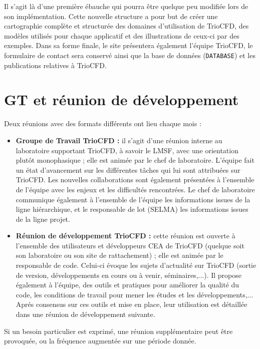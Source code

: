 Il s'agit l\`a d'une premi\`ere \'ebauche qui pourra \^etre quelque peu modifi\'ee lors de son impl\'ementation. Cette nouvelle structure a pour but de cr\'eer une cartographie compl\`ete et structur\'ee des domaines d'utilisation de TrioCFD, des mod\`eles utilis\'es pour chaque applicatif et des illustrations de ceux-ci par des exemples. Dans sa forme finale, le site pr\'esentera \'egalement l'\'equipe TrioCFD, le formulaire de contact sera conserv\'e ainsi que la base de donn\'ees (\texttt{DATABASE}) et les publications relatives \`a TrioCFD.

\chapter{GT et r\'eunion de d\'eveloppement}
Deux r\'eunions avec des formats diff\'erents ont lieu chaque mois :
\begin{itemize}[label=$\Rightarrow$, font=\LARGE]
\item \textbf{Groupe de Travail TrioCFD :} il s'agit d'une r\'eunion interne au laboratoire supportant TrioCFD, \`a savoir le LMSF, avec une orientation plut\^ot monophasique ; elle est anim\'ee par le chef de laboratoire. L'\'equipe fait un \'etat d'avancement sur les diff\'erentes t\^aches qui lui sont attribu\'ees sur TrioCFD. Les nouvelles collaborations sont \'egalement pr\'esent\'ees \`a l'ensemble de l'\'equipe avec les enjeux et les difficult\'es rencontr\'ees. Le chef de laboratoire communique \'egalement \`a l'ensemble de l'\'equipe les informations issues de la ligne hiérarchique, et le responsable de lot (SELMA) les informations issues de la ligne projet.
\item \textbf{R\'eunion de d\'eveloppement TrioCFD :} cette r\'eunion est ouverte \`a l'ensemble des utilisateurs et d\'eveloppeurs CEA de TrioCFD (quelque soit son laboratoire ou son site de rattachement) ; elle est anim\'ee par le responsable de code. Celui-ci \'evoque les sujets d'actualit\'e sur TrioCFD (sortie de version, d\'eveloppements en cours ou \`a venir, s\'eminaires,...). Il propose \'egalement \`a l'\'equipe, des outils et pratiques pour am\'eliorer la qualit\'e du code, les conditions de travail pour mener les \'etudes et les d\'eveloppements,... Apr\'es consensus sur ces outils et mise en place, leur utilisation est d\'etaill\'ee dans une r\'eunion de d\'eveloppement suivante.
\end{itemize}

Si un besoin particulier est exprim\'e, une r\'eunion suppl\'ementaire peut \^etre provoqu\'ee, ou la fr\'equence augment\'ee sur une p\'eriode donn\'ee.

